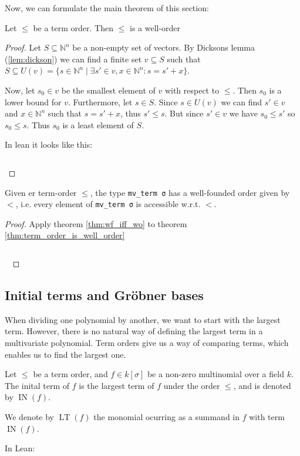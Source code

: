 \documentclass[a4paper, 12pt]{article}
\newcommand{\N}{\mathbb{N}}
\DeclareMathOperator{\IN}{IN}
\DeclareMathOperator{\LT}{LT}
\newcommand{\lean}[1]{\texttt{#1}}
\theoremstyle{changedot}
\theoremstyle{changedotbreak}
\theoremstyle{nonumberplain}
\newtheorem{proof}{Proof}
\begin{document}
Now, we can formulate the main theorem of this section:

\begin{theorem}\label{thm:term_order_is_well_order}
  Let $\le$ be a term order. Then $\le$ is a well-order
\end{theorem}
\begin{proof}
  Let $S \subseteq \N^{n}$ be a non-empty set of vectors. By Dicksons lemma (\ref{lem:dickson}) we can find a finite set $v \subseteq S$ such that $S \subseteq U(v) = \{s \in \N^{n} \mid \exists s' \in v, x \in \N^{n} : s = s' + x\}$.

  Now, let $s_{0} \in v$ be the smallest element of $v$ with respect to $\le$. Then $s_{0}$ is a lower bound for $v$. Furthermore, let $s \in S$. Since $s \in U(v)$ we can find $s' \in v$ and $x \in \N^{n}$ such that $s = s' + x$, thus $s' \le s$. But since $s' \in v$ we have $s_{0} \le s'$ so $s_{0} \le s$. Thus $s_{0}$ is a least element of $S$.

  In lean it looks like this:

  \inputminted[firstline=71, lastline=95]{lean}{../src/monomial_order.lean}
\end{proof}

\begin{corollary}
  Given er term-order $\le$, the type \lean{mv_term σ} has a well-founded order given by $<$, i.e. every element of \lean{mv_term σ} is accessible w.r.t. $<$.
\end{corollary}
\begin{proof}
  Apply theorem \ref{thm:wf_iff_wo} to theorem \ref{thm:term_order_is_well_order}

  \inputminted[firstline=97, lastline=104]{lean}{../src/monomial_order.lean}
  ~
\end{proof}



\subsection{Initial terms and Gröbner bases}

When dividing one polynomial by another, we want to start with the largest term. However, there is no natural way of defining the largest term in a multivariate polynomial. Term orders give us a way of comparing terms, which enables us to find the largest one.

\begin{definition}
  Let $\le$ be a term order, and $f \in k[\sigma]$ be a non-zero multinomial over a field $k$. The inital term of $f$ is the largest term of $f$ under the order $\le$, and is denoted by $\IN(f)$.

  We denote by $\LT(f)$ the monomial ocurring as a summand in $f$ with term $\IN(f)$.

  In Lean:
  \inputminted[firstline=21, lastline=25]{lean}{../src/initial_term.lean}
\end{definition}
\end{document}
